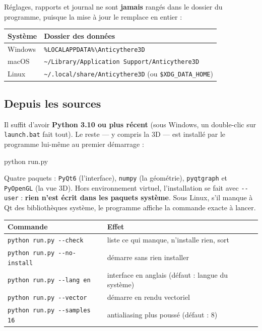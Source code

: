 \documentclass[a4paper,11pt]{article}
\begin{document}
Réglages, rapports et journal ne sont \textbf{jamais} rangés dans le dossier du
programme, puisque la mise à jour le remplace en entier :

\begin{center}
\begin{tabularx}{0.9\textwidth}{@{}lX@{}}
\toprule
\rowcolor{lightblue}\textbf{Système} & \textbf{Dossier des données} \\
\midrule
Windows & \texttt{\%LOCALAPPDATA\%\textbackslash Anticythere3D} \\
macOS & \texttt{\textasciitilde/Library/Application Support/Anticythere3D} \\
Linux & \texttt{\textasciitilde/.local/share/Anticythere3D} (ou
\texttt{\$XDG\_DATA\_HOME}) \\
\bottomrule
\end{tabularx}
\end{center}

\subsection{Depuis les sources}

Il suffit d'avoir \textbf{Python 3.10 ou plus récent} (sous Windows, un
double-clic sur \texttt{launch.bat} fait tout). Le reste — y compris la 3D —
est installé par le programme lui-même au premier démarrage :

\begin{center}
\begin{tcolorbox}[colback=lightgray, colframe=darkgray, width=0.85\textwidth,
  arc=2mm, fontupper=\ttfamily]
python run.py
\end{tcolorbox}
\end{center}

\begin{astuce}[Ce qu'il installe, et où]
Quatre paquets : \texttt{PyQt6} (l'interface), \texttt{numpy} (la géométrie),
\texttt{pyqtgraph} et \texttt{PyOpenGL} (la vue 3D). Hors environnement
virtuel, l'installation se fait avec \texttt{-{}-user} : \textbf{rien n'est
écrit dans les paquets système}. Sous Linux, s'il manque à Qt des
bibliothèques système, le programme affiche la commande exacte à lancer.
\end{astuce}

\begin{center}
\begin{tabularx}{0.95\textwidth}{@{}lX@{}}
\toprule
\rowcolor{lightblue}\textbf{Commande} & \textbf{Effet} \\
\midrule
\texttt{python run.py -{}-check} & liste ce qui manque, n'installe rien, sort \\
\texttt{python run.py -{}-no-install} & démarre sans rien installer \\
\texttt{python run.py -{}-lang en} & interface en anglais (défaut : langue du système) \\
\texttt{python run.py -{}-vector} & démarre en rendu vectoriel \\
\texttt{python run.py -{}-samples 16} & antialiasing plus poussé (défaut : 8) \\
\bottomrule
\end{tabularx}
\end{center}
\end{document}
